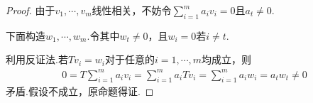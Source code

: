 \begin{proof}
    由于\(v_1,\cdots,v_m\)线性相关，不妨令\(\sum_{i=1}^m a_iv_i=0\)且\(a_t \ne 0\).

    下面构造\(w_1,\cdots,w_m\).令其中\(w_t \ne 0\)，且\(w_i=0\)若\(i \ne t\).
    
    利用反证法.若\(Tv_i=w_i\)对于任意的\(i=1,\cdots,m\)均成立，则
    \begin{align*}
        0=T\sum_{i=1}^m a_iv_i=\sum_{i=1}^m a_iTv_i=\sum_{i=1}^m a_iw_i=a_tw_t \ne 0
    \end{align*}
    矛盾.假设不成立，原命题得证.    
\end{proof}

